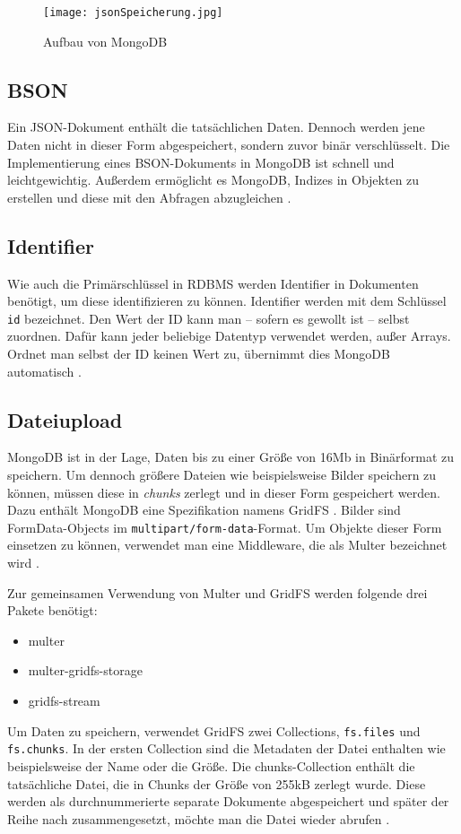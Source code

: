 \begin{figure}
    \centering
    \texttt{[image: jsonSpeicherung.jpg]}
    \label{img:jsonSpeicherung}
    \caption{Aufbau von MongoDB \cite[S.30]{zwei}}
\end{figure}

\subsection{BSON}
Ein JSON-Dokument enthält die tatsächlichen Daten. Dennoch werden jene Daten nicht in dieser Form abgespeichert, sondern zuvor binär verschlüsselt. Die Implementierung eines BSON-Dokuments in MongoDB ist schnell und leichtgewichtig. Außerdem ermöglicht es MongoDB, Indizes in Objekten zu erstellen und diese mit den Abfragen abzugleichen \cite[S.31]{zwei}. 


\subsection{Identifier}

Wie auch die Primärschlüssel in RDBMS werden Identifier in Dokumenten benötigt, um diese identifizieren zu können. Identifier werden mit dem Schlüssel \texttt{id} bezeichnet. Den Wert der ID kann man – sofern es gewollt ist – selbst zuordnen. Dafür kann jeder beliebige Datentyp verwendet werden, außer Arrays. Ordnet man selbst der ID keinen Wert zu, übernimmt dies MongoDB automatisch \cite[S.32]{zwei}.


\subsection{Dateiupload}
MongoDB ist in der Lage, Daten bis zu einer Größe von 16Mb in Binärformat zu speichern. Um dennoch größere Dateien wie beispielsweise Bilder speichern zu können, müssen diese in \textit{chunks} zerlegt und in dieser Form gespeichert werden. Dazu enthält MongoDB eine Spezifikation namens GridFS \cite{gridfs}.  Bilder sind FormData-Objects im \texttt{multipart/form-data}-Format. Um Objekte dieser Form einsetzen zu können, verwendet man eine Middleware, die als Multer bezeichnet wird \cite{multer}. 

Zur gemeinsamen Verwendung von Multer und GridFS werden folgende drei Pakete benötigt:
\begin{itemize}
    \item multer
    \item multer-gridfs-storage
    \item gridfs-stream
\end{itemize}

Um Daten zu speichern, verwendet GridFS zwei Collections, \texttt{fs.files} und \texttt{fs.chunks}. In der ersten Collection sind die Metadaten der Datei enthalten wie beispielsweise der Name oder die Größe. Die chunks-Collection enthält die tatsächliche Datei, die in Chunks der Größe von 255kB zerlegt wurde. Diese werden als durchnummerierte separate Dokumente abgespeichert und später der Reihe nach zusammengesetzt, möchte man die Datei wieder abrufen \cite{ganguli}. 
